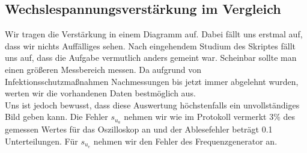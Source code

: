 \subsection{Wechslespannungsverstärkung im Vergleich}

Wir tragen die Verstärkung in einem Diagramm auf. Dabei fällt uns erstmal auf, dass wir nichts Auffälliges sehen. Nach eingehendem Studium des Skriptes fällt uns auf, dass 
die Aufgabe vermutlich anders gemeint war. Scheinbar sollte man einen größeren Messbereich messen. Da aufgrund von Infektionsschutzmaßnahmen Nachmessungen bis jetzt immer 
abgelehnt wurden, werten wir die vorhandenen Daten bestmöglich aus.\\
Uns ist jedoch bewusst, dass diese Auswertung höchstenfalls ein unvollständiges Bild geben kann. Die Fehler $s_{u_a}$
nehmen wir wie im Protokoll vermerkt 3\% des gemessen Wertes für das Oszilloskop an und der Ablesefehler beträgt 0.1 Unterteilungen. Für $s_{u_e}$ nehmen wir den Fehler des Frequenzgenerator an.



